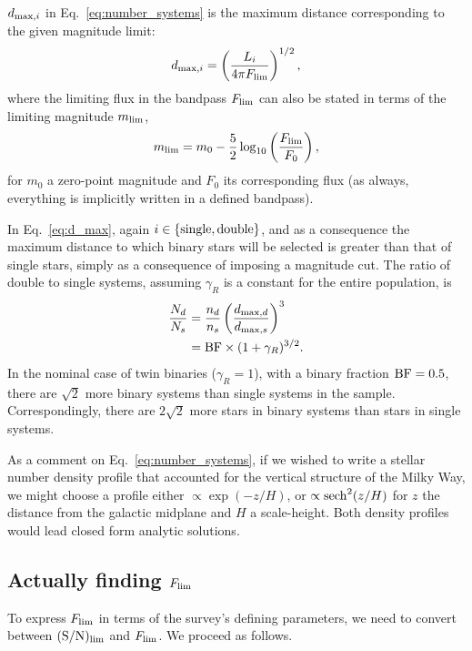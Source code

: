 \documentclass{emulateapj}
\begin{document}
$d_{{\rm max},i}$ in Eq.~\ref{eq:number_systems} is the maximum distance 
corresponding to the given magnitude limit:
\begin{equation}
d_{{\rm max},i} = \left(\frac{L_{i}}{4 \pi F_{{\rm lim}}}\right)^{1/2},
\label{eq:d_max}
\end{equation}
where the limiting flux in the bandpass $F_{{\rm lim}}$ can also be 
stated in terms of the limiting magnitude $m_{{\rm lim}}$,
\begin{equation}
m_{{\rm lim}} = m_{0} - \frac{5}{2} \log_{10} \left(\frac{F_{{\rm 
lim}}}{F_{0}}\right),
\end{equation}
for $m_{0}$ a zero-point magnitude and $F_{0}$ its corresponding flux (as 
always, everything is implicitly written in a defined bandpass).

In Eq.~\ref{eq:d_max}, again $i\in{\rm \{single,double\} }$, and as a 
consequence the maximum distance to which binary stars will be selected is 
greater than that of single stars, simply as a consequence of imposing a 
magnitude cut.
The ratio of double to single systems, assuming $\gamma_R$ is a constant for 
the entire population, is
\begin{align}
\frac{N_d}{N_s} &= 
	\frac{n_d}{n_s} \left(\frac{d_{{\rm max}, d} }{d_{{\rm max}, s}}\right)^3 \\
&= {\rm BF} \times (1+\gamma_R)^{3/2}.
\end{align}
In the nominal case of twin binaries ($\gamma_R = 1$), with a binary fraction 
${\rm BF} = 0.5$, there are 
$\sqrt{2}$ more binary systems than single systems in the sample.
Correspondingly, there are $2\sqrt{2}$ more stars in binary systems than stars 
in single systems.

As a comment on Eq.~\ref{eq:number_systems}, if 
we wished to write a stellar number density profile that accounted for the 
vertical structure of the Milky Way, we might choose a profile either 
$\propto \exp(-z/H)$, or $\propto {\rm sech}^2(z/H)$ for $z$ the distance from 
the galactic midplane and $H$ a scale-height. Both density profiles would lead 
closed form analytic solutions.

\subsection{Actually finding $F_{\rm lim}$}

To express $F_{\rm lim}$ in terms of the survey's defining parameters, we need 
to convert between ${\rm (S/N)_{lim}}$ and $F_{\rm lim}$. We proceed as follows.
\end{document}
